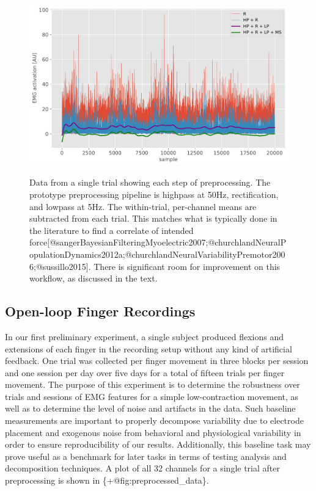 \begin{figure}
\label{fig:preprocessing_steps}
\centering
\includegraphics[width=1\textwidth,height=\textheight]{images/data_analysis/fingers/preprocessing_steps.pdf}
\caption{Data from a single trial showing each step of preprocessing.
The prototype preprocessing pipeline is highpass at 50Hz, rectification,
and lowpass at 5Hz. The within-trial, per-channel means are subtracted
from each trial. This matches what is typically done in the literature
to find a correlate of intended
force{[}@sangerBayesianFilteringMyoelectric2007;@churchlandNeuralPopulationDynamics2012a;@churchlandNeuralVariabilityPremotor2006;@sussillo2015{]}.
There is significant room for improvement on this workflow, as discussed
in the text.}\label{fig:preprocessing_steps}
\end{figure}

\subsection{Open-loop Finger
Recordings}\label{open-loop-finger-recordings}

In our first preliminary experiment, a single subject produced flexions
and extensions of each finger in the recording setup without any kind of
artificial feedback. One trial was collected per finger movement in
three blocks per session and one session per day over five days for a
total of fifteen trials per finger movement. The purpose of this
experiment is to determine the robustness over trials and sessions of
EMG features for a simple low-contraction movement, as well as to
determine the level of noise and artifacts in the data. Such baseline
measurements are important to properly decompose variability due to
electrode placement and exogenous noise from behavioral and
physiological variability in order to ensure reproducibility of our
results. Additionally, this baseline task may prove useful as a
benchmark for later tasks in terms of testing analysis and decomposition
techniques. A plot of all 32 channels for a single trial after
preprocessing is shown in \{+@fig:preprocessed\_data\}.

